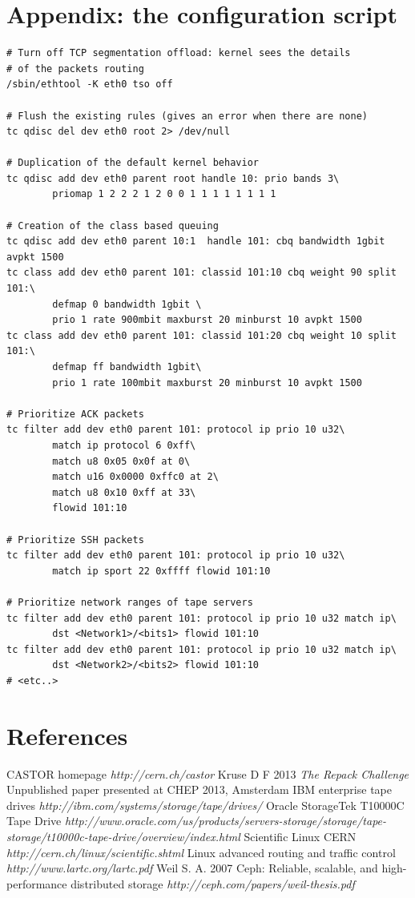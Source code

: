 \documentclass[a4paper]{jpconf}
\begin{document}
\appendix
\section*{Appendix: the configuration script}
\begin{lstlisting}[caption={Traffic control setting script},label=tshape_script]
# Turn off TCP segmentation offload: kernel sees the details 
# of the packets routing
/sbin/ethtool -K eth0 tso off

# Flush the existing rules (gives an error when there are none)
tc qdisc del dev eth0 root 2> /dev/null

# Duplication of the default kernel behavior
tc qdisc add dev eth0 parent root handle 10: prio bands 3\
        priomap 1 2 2 2 1 2 0 0 1 1 1 1 1 1 1 1
		
# Creation of the class based queuing
tc qdisc add dev eth0 parent 10:1  handle 101: cbq bandwidth 1gbit avpkt 1500
tc class add dev eth0 parent 101: classid 101:10 cbq weight 90 split 101:\
        defmap 0 bandwidth 1gbit \
        prio 1 rate 900mbit maxburst 20 minburst 10 avpkt 1500
tc class add dev eth0 parent 101: classid 101:20 cbq weight 10 split 101:\
        defmap ff bandwidth 1gbit\
        prio 1 rate 100mbit maxburst 20 minburst 10 avpkt 1500
        
# Prioritize ACK packets
tc filter add dev eth0 parent 101: protocol ip prio 10 u32\
        match ip protocol 6 0xff\
        match u8 0x05 0x0f at 0\
        match u16 0x0000 0xffc0 at 2\
        match u8 0x10 0xff at 33\
        flowid 101:10
        
# Prioritize SSH packets
tc filter add dev eth0 parent 101: protocol ip prio 10 u32\
        match ip sport 22 0xffff flowid 101:10

# Prioritize network ranges of tape servers
tc filter add dev eth0 parent 101: protocol ip prio 10 u32 match ip\
        dst <Network1>/<bits1> flowid 101:10
tc filter add dev eth0 parent 101: protocol ip prio 10 u32 match ip\
        dst <Network2>/<bits2> flowid 101:10
# <etc..>
\end{lstlisting}


\section*{References}
\begin{thebibliography}{6}
\bibitem{CASTORweb}CASTOR homepage {\it{}http://cern.ch/castor}
Kruse D F 2013 {\it{}The Repack Challenge} Unpublished paper presented at CHEP 2013, Amsterdam 
\bibitem{IBM}IBM enterprise tape drives {\it{}http://ibm.com/systems/storage/tape/drives/}
\bibitem{STK}Oracle StorageTek T10000C Tape Drive {\it{}http://www.oracle.com/us/products/servers-storage/storage/tape-storage/t10000c-tape-drive/overview/index.html}
\bibitem{SLC}Scientific Linux CERN {\it{}http://cern.ch/linux/scientific.shtml}
\bibitem{lartc}Linux advanced routing and traffic control {\it{}http://www.lartc.org/lartc.pdf}
\bibitem{Ceph}Weil S. A. 2007 Ceph: Reliable, scalable, and high-performance distributed storage {\it{}http://ceph.com/papers/weil-thesis.pdf}
\end{thebibliography}
\end{document}
